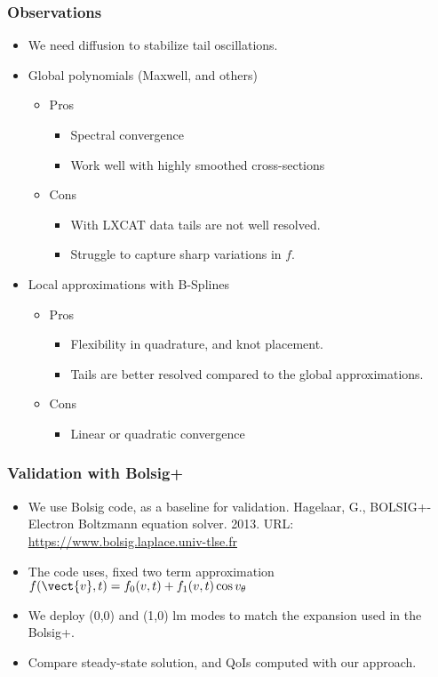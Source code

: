 \begin{frame}
	\frametitle{Observations}
	\begin{itemize}
		\item We need diffusion to stabilize tail oscillations.
		\item Global polynomials (Maxwell, and others)
		\begin{itemize}
			\item Pros
			\begin{itemize}
				\item Spectral convergence
				\item Work well with highly smoothed cross-sections
			\end{itemize}
			\item Cons
			\begin{itemize}
				\item With LXCAT data tails are not well resolved. 
				\item Struggle to capture sharp variations in $f$.
			\end{itemize}
		\end{itemize}
		\item Local approximations with B-Splines
		\begin{itemize}
			\item Pros
			\begin{itemize}
				\item Flexibility in quadrature, and knot placement. 
				\item Tails are better resolved compared to the global approximations. 
			\end{itemize}
			\item Cons
			\begin{itemize}
				\item Linear or quadratic convergence
			\end{itemize}
		\end{itemize}
	\end{itemize}
\end{frame}

\begin{frame}
	\frametitle{Validation with Bolsig+}
	\begin{itemize}
		\item We use Bolsig code, as a baseline for validation. 
		Hagelaar, G., BOLSIG+-Electron Boltzmann equation solver. 2013. URL: \url{https://www.bolsig.laplace.univ-tlse.fr}
		\item The code uses, fixed two term approximation $f(\vect{v},t) = f_0(v, t) + f_1(v,t)\cos v_\theta$
		\item We deploy (0,0) and (1,0) lm modes to match the expansion used in the Bolsig+.
		\item Compare steady-state solution, and QoIs computed with our approach. 
	\end{itemize}
\end{frame}

